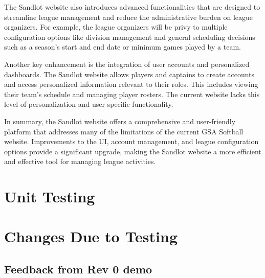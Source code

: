 \documentclass[12pt, titlepage]{article}
\begin{document}
The Sandlot website also introduces advanced functionalities that are designed to streamline
league management and reduce the administrative burden on league organizers. For example, the
league organizers will be privy to multiple configuration options like division management and
general scheduling decisions such as a season's start and end date or minimum games played
by a team.

Another key enhancement is the integration of user accounts and personalized dashboards.
The Sandlot website allows players and captains to create accounts and access personalized
information relevant to their roles. This includes viewing their team's schedule and
managing player rosters. The current website lacks this level of personalization and
user-specific functionality.

In summary, the Sandlot website offers a comprehensive and user-friendly platform that
addresses many of the limitations of the current GSA Softball website. Improvements to the UI,
account management, and league configuration options provide a significant upgrade,
making the Sandlot website a more efficient and effective tool for managing league activities.

\section{Unit Testing}

\section{Changes Due to Testing}


\subsection{Feedback from Rev 0 demo}
\end{document}
